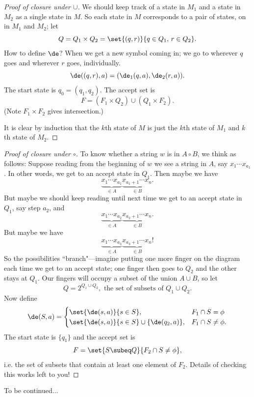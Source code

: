\begin{proof}[Proof of closure under $\cup$]
We should keep track of a state in $M_1$ and a state in $M_2$ as a single state in $M$. So each state in $M$ corresponds to a pair of states, on in $M_1$ and $M_2$; let
\[Q=Q_1\times Q_2=\set{(q,r)}{q\in Q_1,\,r\in Q_2}.\]
How to define $\de$? When we get a new symbol coming in; we go to wherever $q$ goes and wherever $r$ goes, individually.
\[
\de((q,r),a)=(\de_1(q,a),\de_2(r,a)).
\]
The start state is $q_0=(q_1,q_2)$. The accept set is
\[
F=(F_1\times Q_2)\cup (Q_1\times F_2).
\]
(Note $F_1\times F_2$ gives intersection.)

It is clear by induction that the $k$th state of $M$ is just the $k$th state of $M_1$ and $k$th state of $M_2$.
\end{proof}

\begin{proof}[Proof of closure under $\circ$]
To know whether a string $w$ is in $A\circ B$, we think as follows: Suppose reading from the beginning of $w$ we see a string in $A$, say $x_1\cdots x_{a_1}$. In other words, we get to an accept state in $Q_1$. Then maybe we have
\[
\underbrace{x_1\cdots x_{a_1}}_{\in A}\underbrace{x_{a_1+1}\cdots x_{n}}_{\in B}.
\]
But maybe we should keep reading until next time we get to an accept state in $Q_1$, say step $a_2$, and 
\[
\underbrace{x_1\cdots x_{a_2}}_{\in A}\underbrace{x_{a_2+1}\cdots x_{n}}_{\in B}.
\]
But maybe we have 
\[
\underbrace{x_1\cdots x_{a_3}}_{\in A}\underbrace{x_{a_3+1}\cdots x_{n}}_{\in B}!
\]
So the possibilities ``branch"---imagine putting one more finger on the diagram each time we get to an accept state; one finger then goes to $Q_2$ and the other stays at $Q_1$. Our fingers will occupy a subset of the union $A\cup B$, so let
\[
Q=2^{Q_1\cup Q_2},\text{ the set of subsets of }Q_1\cup Q_2.
\]
Now define
\[
\de(S,a)=\begin{cases}\set{\de(s,a)}{s\in S},&F_1\cap S= \phi\\
\set{\de(s,a)}{s\in S}\cup \{\de(q_2,a)\},&F_1\cap S\ne \phi.
\end{cases}
\]
The start state is $\{q_1\}$ and the accept set is
\[
F=\set{S\subeq Q}{F_2\cap S\ne \phi},
\]
i.e. the set of subsets that contain at least one element of $F_2$. Details of checking this works left to you!
\end{proof}
To be continued...